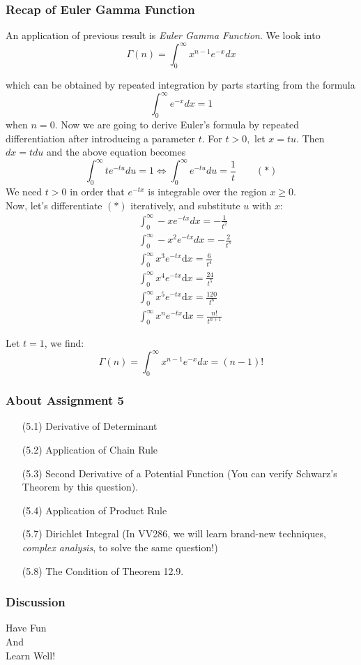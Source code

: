 \documentclass[12pt, t]{beamer}
\renewcommand{\emph}[1]{{\color{Turquoise3}\textsl{#1}}}
\begin{document}
\begin{frame}[allowframebreaks]
    \frametitle{Recap of Euler Gamma Function}
    An application of previous result is \emph{Euler Gamma Function}. We look into $$\Gamma(n) = \int_{0}^{\infty}x^{n-1}e^{-x}{d}x$$

    which can be obtained by repeated integration by parts starting from the formula
    \[
        \int_{0}^{\infty} e^{-x} d x=1
    \]
    when $n=0 .$ Now we are going to derive Euler's formula by repeated differentiation after introducing a parameter $t$. For $t>0,$ let $x=t u .$ Then $d x=t d u$ and the above equation becomes
    \[
        \int_{0}^{\infty} t e^{-t u} d u=1 \Leftrightarrow
        \int_{0}^{\infty}  e^{-t u} d u=\dfrac{1}{t} \qquad(*)
    \]
    We need $t>0$ in order that $e^{-t x}$ is integrable over the region $x \geq 0$.\\
    Now, let's differentiate $(*)$ iteratively, and substitute $u$ with $x$:
    $$ \begin{aligned}
             & \int_{0}^{\infty}-x e^{-t x} d x=-\frac{1}{t^{2}}                 \\
             & \int_{0}^{\infty}-x^{2} e^{-t x} d x=-\frac{2}{t^{3}}             \\
             & \int_{0}^{\infty} x^{3} e^{-t x} \mathrm{d} x=\frac{6}{t^{4}}     \\
             & \int_{0}^{\infty} x^{4} e^{-t x} \mathrm{d} x=\frac{24}{t^{5}}    \\
             & \int_{0}^{\infty} x^{5} e^{-t x} \mathrm{d} x=\frac{120}{t^{6}}   \\
             & \int_{0}^{\infty} x^{n} e^{-t x} \mathrm{d} x=\frac{n !}{t^{n+1}}
        \end{aligned} $$

    Let $t=1$, we find:
    $$\Gamma(n) = \int_{0}^{\infty}x^{n-1}e^{-x}{d}x
        =(n-1)! $$
\end{frame}

\begin{frame}
    \frametitle{About Assignment 5}
    \begin{enumerate}
        \item[(5.1)] Derivative of Determinant
        \item[(5.2)] Application of Chain Rule
        \item[(5.3)] Second Derivative of a Potential Function (You can verify Schwarz’s Theorem by this question).
        \item[(5.4)] Application of Product Rule
        \item[(5.7)] Dirichlet Integral (In VV286, we will learn brand-new techniques, \emph{complex analysis}, to solve the same question!)
        \item[(5.8)] The Condition of Theorem 12.9.
    \end{enumerate}
\end{frame}

\begin{frame}
    \frametitle{Discussion}
    \vspace{1cm}
    \begin{center}
        \LARGE
        Have Fun\\
        And\\
        Learn Well!
    \end{center}
\end{frame}
\end{document}
